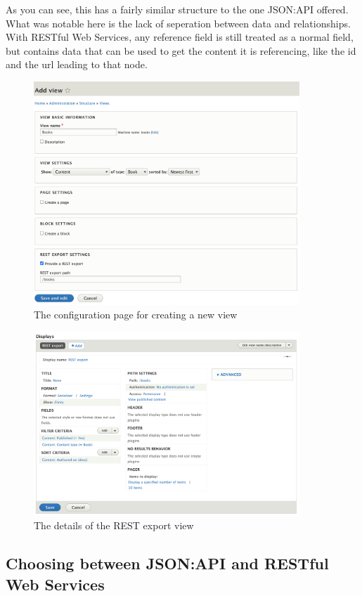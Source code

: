 As you can see, this has a fairly similar structure to the one JSON:API offered. What was notable here is the lack of seperation between data and relationships. With RESTful Web Services, any reference field is still treated as a normal field, but contains data that can be used to get the content it is referencing, like the id and the url leading to that node.

\begin{figure}[h]
	\centering
	\includegraphics[width=10cm]{./img/View_Create.png}
	\caption[Creating a View]{The configuration page for creating a new view}
\end{figure}

\begin{figure}[h]
	\centering
	\includegraphics[width=10cm]{./img/View_Details.png}
	\caption[Details of a REST export View]{The details of the REST export view}
	\label{fig:RESTView}
\end{figure}

\subsection{Choosing between JSON:API and RESTful Web Services}

